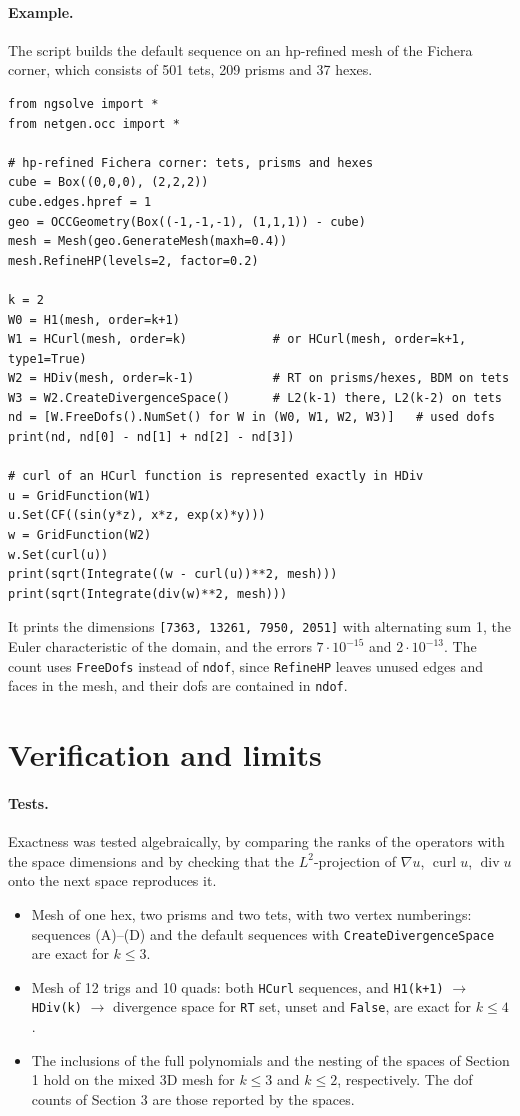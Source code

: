 \documentclass[10pt,a4paper]{article}
\newcommand{\code}[1]{\texttt{#1}}
\newcommand{\curl}{\operatorname{curl}}\renewcommand{\div}{\operatorname{div}}
\begin{document}
\paragraph{Example.}
The script builds the default sequence on an hp-refined mesh of the Fichera corner, which consists of 501 tets, 209 prisms and 37 hexes.
\begin{lstlisting}
from ngsolve import *
from netgen.occ import *

# hp-refined Fichera corner: tets, prisms and hexes
cube = Box((0,0,0), (2,2,2))
cube.edges.hpref = 1
geo = OCCGeometry(Box((-1,-1,-1), (1,1,1)) - cube)
mesh = Mesh(geo.GenerateMesh(maxh=0.4))
mesh.RefineHP(levels=2, factor=0.2)

k = 2
W0 = H1(mesh, order=k+1)
W1 = HCurl(mesh, order=k)            # or HCurl(mesh, order=k+1, type1=True)
W2 = HDiv(mesh, order=k-1)           # RT on prisms/hexes, BDM on tets
W3 = W2.CreateDivergenceSpace()      # L2(k-1) there, L2(k-2) on tets
nd = [W.FreeDofs().NumSet() for W in (W0, W1, W2, W3)]   # used dofs
print(nd, nd[0] - nd[1] + nd[2] - nd[3])

# curl of an HCurl function is represented exactly in HDiv
u = GridFunction(W1)
u.Set(CF((sin(y*z), x*z, exp(x)*y)))
w = GridFunction(W2)
w.Set(curl(u))
print(sqrt(Integrate((w - curl(u))**2, mesh)))
print(sqrt(Integrate(div(w)**2, mesh)))
\end{lstlisting}
It prints the dimensions \code{[7363, 13261, 7950, 2051]} with alternating sum 1, the Euler characteristic of the domain, and the errors $7\cdot10^{-15}$ and $2\cdot10^{-13}$. The count uses \code{FreeDofs} instead of \code{ndof}, since \code{RefineHP} leaves unused edges and faces in the mesh, and their dofs are contained in \code{ndof}.

\section{Verification and limits}

\paragraph{Tests.}
Exactness was tested algebraically, by comparing the ranks of the operators with the space dimensions and by checking that the $L^2$-projection of $\nabla u$, $\curl u$, $\div u$ onto the next space reproduces it.
\begin{itemize}\setlength\itemsep{1pt}
\item Mesh of one hex, two prisms and two tets, with two vertex numberings: sequences (A)--(D) and the default sequences with \code{CreateDivergenceSpace} are exact for $k\le 3$.
\item Mesh of 12 trigs and 10 quads: both \code{HCurl} sequences, and \code{H1(k+1)} $\to$ \code{HDiv(k)} $\to$ divergence space for \code{RT} set, unset and \code{False}, are exact for $k\le4$.
\item The inclusions of the full polynomials and the nesting of the spaces of Section 1 hold on the mixed 3D mesh for $k\le 3$ and $k \le 2$, respectively. The dof counts of Section 3 are those reported by the spaces.
\end{itemize}
\end{document}
